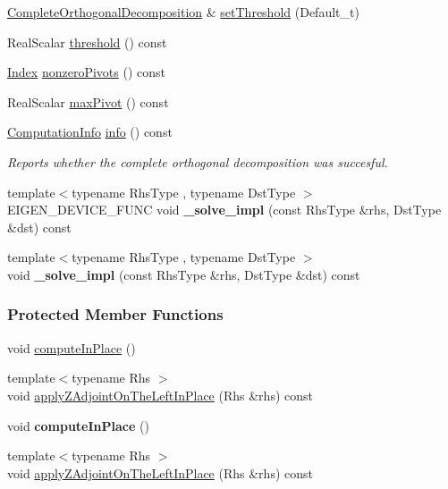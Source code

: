 \begin{DoxyCompactItemize}
\item 
\hyperlink{group___q_r___module_class_eigen_1_1_complete_orthogonal_decomposition}{Complete\+Orthogonal\+Decomposition} \& \hyperlink{group___q_r___module_a27c8da71874be7a64d6723bd0cae9f4f}{set\+Threshold} (Default\+\_\+t)
\item 
Real\+Scalar \hyperlink{group___q_r___module_a3909f07268496c0f08f1b57331d91075}{threshold} () const
\item 
\hyperlink{namespace_eigen_a62e77e0933482dafde8fe197d9a2cfde}{Index} \hyperlink{group___q_r___module_af9d7a5bdbc16a4a0bf7394ef0dd208da}{nonzero\+Pivots} () const
\item 
Real\+Scalar \hyperlink{group___q_r___module_a5b712a58c13b7e5089be9228ec42f738}{max\+Pivot} () const
\item 
\hyperlink{group__enums_ga85fad7b87587764e5cf6b513a9e0ee5e}{Computation\+Info} \hyperlink{group___q_r___module_a1f5c45f78848cfdbb96963cefbbb3274}{info} () const
\begin{DoxyCompactList}\small\item\em Reports whether the complete orthogonal decomposition was succesful. \end{DoxyCompactList}\item 
\mbox{\label{group___q_r___module_a0b288fc8c0c84da06601d75aa5dc72fb}} 
{\footnotesize template$<$typename Rhs\+Type , typename Dst\+Type $>$ }\\E\+I\+G\+E\+N\+\_\+\+D\+E\+V\+I\+C\+E\+\_\+\+F\+U\+NC void {\bfseries \+\_\+solve\+\_\+impl} (const Rhs\+Type \&rhs, Dst\+Type \&dst) const
\item 
\mbox{\label{group___q_r___module_a6b6db285a30edd61d7ea2690062f4a93}} 
{\footnotesize template$<$typename Rhs\+Type , typename Dst\+Type $>$ }\\void {\bfseries \+\_\+solve\+\_\+impl} (const Rhs\+Type \&rhs, Dst\+Type \&dst) const
\end{DoxyCompactItemize}
\subsubsection*{Protected Member Functions}
\begin{DoxyCompactItemize}
\item 
void \hyperlink{group___q_r___module_adb0b963d7d8f96492904e8eda03efbf5}{compute\+In\+Place} ()
\item 
{\footnotesize template$<$typename Rhs $>$ }\\void \hyperlink{group___q_r___module_a0a89641e0b4ea92c515405f2a31e6abe}{apply\+Z\+Adjoint\+On\+The\+Left\+In\+Place} (Rhs \&rhs) const
\item 
\mbox{\label{group___q_r___module_a5fdf1c5e8ac31dbc1caa51e6bcf3eab3}} 
void {\bfseries compute\+In\+Place} ()
\item 
{\footnotesize template$<$typename Rhs $>$ }\\void \hyperlink{group___q_r___module_a0df74ceda234583a69d307c56bba4263}{apply\+Z\+Adjoint\+On\+The\+Left\+In\+Place} (Rhs \&rhs) const
\end{DoxyCompactItemize}
